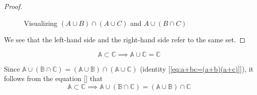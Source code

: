 \documentclass[11pt]{book}
\theoremstyle{definition}
\theoremstyle{plain}
\theoremstyle{definition}
\theoremstyle{problemstyle}
\theoremstyle{remark}
\theoremstyle{definition}
\begin{document}
\begin{proof}
\begin{figure}[H]
    \caption{Visualizing $(A\cup B)\cap(A\cup C)$ and $A\cup(B\cap C)$}
  \label{fig:au(bnc)}
\end{figure}

We see that the left-hand side and the right-hand side refer to the same set.
\end{proof}

\begin{equation}
    \label{eq:acupc=c}
    \mathbb{A}\subset\mathbb{C}\implies\mathbb{A}\cup\mathbb{C}=\mathbb{C}
\end{equation}

Since $\mathbb{A}\cup(\mathbb{B}\cap\mathbb{C})=(\mathbb{A}\cup\mathbb{B})\cap(\mathbb{A}\cup\mathbb{C})$ (identity [\ref{eq:a+bc=(a+b)(a+c)}]), it follows from the equation [] that 
\[
    \mathbb{A}\subset\mathbb{C}\implies\mathbb{A}\cup(\mathbb{B}\cap\mathbb{C})=(\mathbb{A}\cup\mathbb{B})\cap\mathbb{C}
\]
\end{document}
